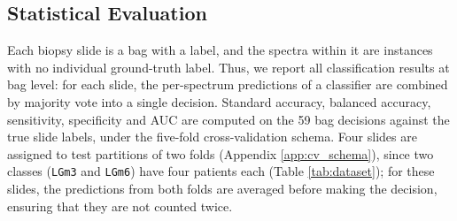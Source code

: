 \documentclass[12pt]{article}
\theoremstyle{paper}
\begin{document}


\subsection{Statistical Evaluation}
\label{sec:statistical_eval}

Each biopsy slide is a bag with a label, and the spectra within it are instances with no individual ground-truth label. Thus, we report all classification results at bag level: for each slide, the per-spectrum predictions of a classifier are combined by majority vote into a single decision. Standard accuracy, balanced accuracy, sensitivity, specificity and AUC are computed on the 59 bag decisions against the true slide labels, under the five-fold cross-validation schema. Four slides are assigned to test partitions of two folds (Appendix \ref{app:cv_schema}), since two classes (\texttt{LGm3} and \texttt{LGm6}) have four patients each (Table \ref{tab:dataset}); for these slides, the predictions from both folds are averaged before making the decision, ensuring that they are not counted twice. 
\end{document}
